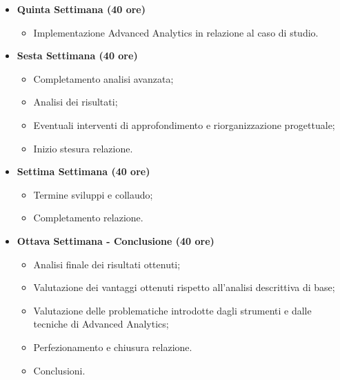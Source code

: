 {\begin{itemize}
\begin{itemize}
        \end{itemize}
        \item \textbf{Quinta Settimana (40 ore)} 
        \begin{itemize}
            \item Implementazione Advanced Analytics in relazione al caso di studio.
        \end{itemize}
        \item \textbf{Sesta Settimana (40 ore)} 
        \begin{itemize}
            \item Completamento analisi avanzata;
            \item Analisi dei risultati;
            \item Eventuali interventi di approfondimento e riorganizzazione progettuale;
            \item Inizio stesura relazione.
        \end{itemize}
        \item \textbf{Settima Settimana (40 ore)} 
        \begin{itemize}
            \item Termine sviluppi e collaudo;
            \item Completamento relazione.
        \end{itemize}
        \item \textbf{Ottava Settimana - Conclusione (40 ore)} 
        \begin{itemize}
            \item Analisi finale dei risultati ottenuti;
            \item Valutazione dei vantaggi ottenuti rispetto all'analisi descrittiva di base;
            \item Valutazione delle problematiche introdotte dagli strumenti e dalle tecniche di Advanced Analytics;
            \item Perfezionamento e chiusura relazione.
            \item Conclusioni.
        \end{itemize}
    \end{itemize}
}

\newcommand{\totaleOre}{}

\newcommand{\obiettiviObbligatori}{
	 \item \underline{\textit{O01}}: primo obiettivo;
	 \item \underline{\textit{O02}}: secondo obiettivo;
	 \item \underline{\textit{O03}}: terzo obiettivo;
	 
}

